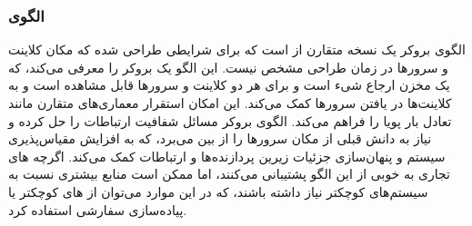 \subsubsection{الگوی }
\label{distrBrokerSec}
\begin{RTL}
الگوی بروکر یک نسخه متقارن از  است که برای شرایطی
طراحی شده که مکان کلاینت و سرورها در زمان طراحی مشخص نیست. این الگو
یک بروکر را معرفی می‌کند، که یک مخزن ارجاع شیء است
و برای هر دو کلاینت و سرورها قابل مشاهده است و
به کلاینت‌ها در یافتن سرورها کمک می‌کند. این امکان استقرار
معماری‌های متقارن مانند تعادل بار پویا را فراهم می‌کند. الگوی بروکر
مسائل شفافیت ارتباطات را حل کرده و نیاز به دانش قبلی از مکان سرورها
را از بین می‌برد، که به افزایش مقیاس‌پذیری سیستم و پنهان‌سازی جزئیات زیرین
پردازنده‌ها و ارتباطات کمک می‌کند. اگرچه های
تجاری به خوبی از این الگو پشتیبانی می‌کنند، اما ممکن است منابع بیشتری
نسبت به سیستم‌های کوچکتر نیاز داشته باشند، که در این
موارد می‌توان از های کوچکتر یا پیاده‌سازی سفارشی استفاده کرد.
\end{RTL}